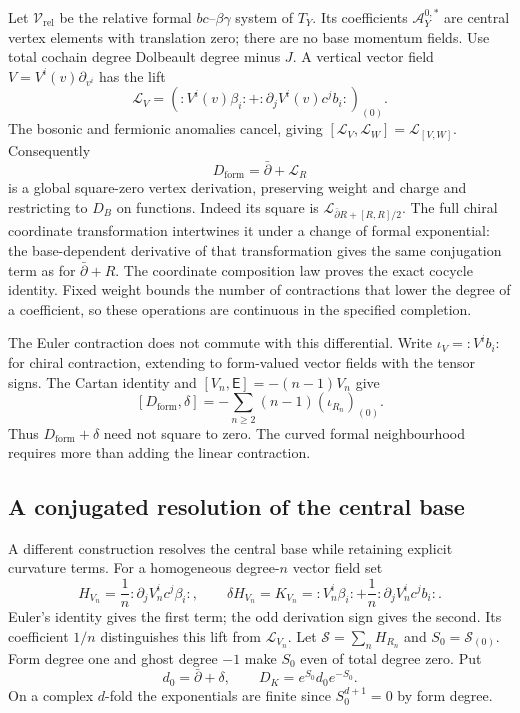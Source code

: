 Let $\mathcal V_{\mathrm{rel}}$ be the relative formal
$bc$--$\beta\gamma$ system of $T_Y$. Its coefficients
$\mathcal A_Y^{0,*}$ are central vertex elements
with translation zero; there are no base
momentum fields. Use total cochain degree
Dolbeault degree minus $J$. A vertical vector
field $V=V^i(v)\partial_{v^i}$ has the lift
\[
 \mathcal L_V=
  \left(:V^i(v)\beta_i:
      +:\partial_jV^i(v)c^jb_i:\right)_{(0)}.
\]
The bosonic and fermionic anomalies cancel,
giving $[\mathcal L_V,\mathcal L_W]
=\mathcal L_{[V,W]}$.
Consequently
\begin{equation}\label{cyprim:eq:formal-field-differential}
 D_{\mathrm{form}}=\bar\partial+\mathcal L_R
\end{equation}
is a global square-zero vertex derivation,
preserving weight and charge and restricting
to $D_B$ on functions. Indeed its square is
$\mathcal L_{\bar\partial R+[R,R]/2}$.
The full chiral coordinate transformation
intertwines it under a change of formal
exponential: the base-dependent derivative
of that transformation gives the same
conjugation term as for $\bar\partial+R$.
The coordinate composition law proves the
exact cocycle identity. Fixed weight bounds
the number of contractions that lower the
degree of a coefficient, so these operations
are continuous in the specified completion.

The Euler contraction does not commute with
this differential. Write $\iota_V=:V^ib_i:$ for chiral
contraction, extending to form-valued vector fields with
the tensor signs. The Cartan identity and
$[V_n,\mathsf E]=-(n-1)V_n$ give
\begin{equation}\label{cyprim:eq:curvature-error}
 [D_{\mathrm{form}},\delta]
       =-\sum_{n\ge2}(n-1)(\iota_{R_n})_{(0)}.
\end{equation}
Thus $D_{\mathrm{form}}+\delta$ need not square
to zero. The curved formal neighbourhood
requires more than adding the linear contraction.

\subsection{A conjugated resolution of the central base}

A different construction resolves the central
base while retaining explicit curvature terms.
For a homogeneous degree-$n$ vector field set
\[
 H_{V_n}=\frac1n:\partial_jV_n^i c^j\beta_i:,
 \qquad
 \delta H_{V_n}=K_{V_n}
 =:V_n^i\beta_i:
       +\frac1n:\partial_jV_n^ic^jb_i:.
\]
Euler's identity gives the first term; the
odd derivation sign gives the second. Its
coefficient $1/n$ distinguishes this lift
from $\mathcal L_{V_n}$.
Let $\mathscr S=\sum_nH_{R_n}$ and
$S_0=\mathscr S_{(0)}$. Form degree one and
ghost degree $-1$ make $S_0$ even of total
degree zero. Put
\begin{equation}\label{cyprim:eq:conjugated-Koszul}
 d_0=\bar\partial+\delta,\qquad
 D_K=e^{S_0}d_0e^{-S_0}.
\end{equation}
On a complex $d$-fold the exponentials are
finite since $S_0^{d+1}=0$ by form degree.

